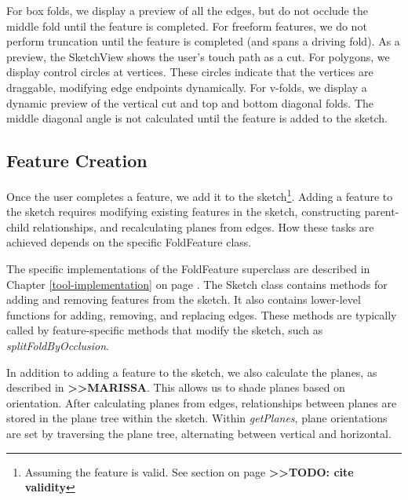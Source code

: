 For box folds, we display a preview of all the edges, but do not occlude
the middle fold until the feature is completed. For freeform features,
we do not perform truncation until the feature is completed (and spans a
driving fold). As a preview, the SketchView shows the user's touch path
as a cut. For polygons, we display control circles at vertices. These
circles indicate that the vertices are draggable, modifying edge
endpoints dynamically. For v-folds, we display a dynamic preview of the
vertical cut and top and bottom diagonal folds. The middle diagonal
angle is not calculated until the feature is added to the sketch.

\subsection{Feature Creation}\label{feature-creation}

Once the user completes a feature, we add it to the sketch\footnote{Assuming
  the feature is valid. See section on page
  \textbf{\textgreater{}\textgreater{}TODO: cite validity}}. Adding a
feature to the sketch requires modifying existing features in the
sketch, constructing parent-child relationships, and recalculating
planes from edges. How these tasks are achieved depends on the specific
FoldFeature class.

The specific implementations of the FoldFeature superclass are described
in Chapter \ref{tool-implementation} on page
\pageref{tool-implementation}. The Sketch class contains methods for
adding and removing features from the sketch. It also contains
lower-level functions for adding, removing, and replacing edges. These
methods are typically called by feature-specific methods that modify the
sketch, such as \emph{splitFoldByOcclusion}.

In addition to adding a feature to the sketch, we also calculate the
planes, as described in \textbf{\textgreater{}\textgreater{}MARISSA}.
This allows us to shade planes based on orientation. After calculating
planes from edges, relationships between planes are stored in the plane
tree within the sketch. Within \emph{getPlanes}, plane orientations are
set by traversing the plane tree, alternating between vertical and
horizontal.
